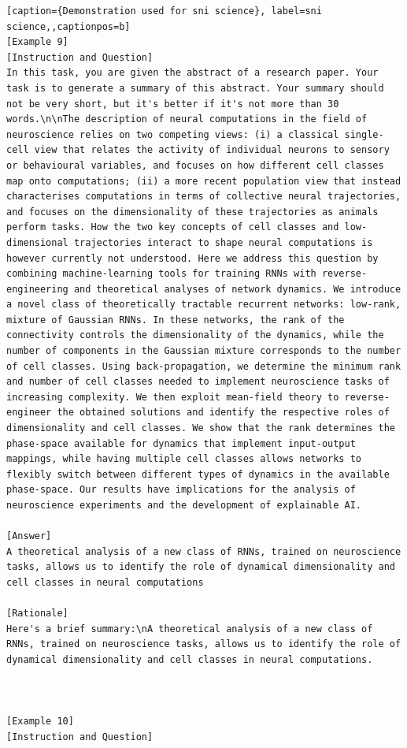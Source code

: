 \begin{lstlisting}[caption={Demonstration used for sni science}, label=sni science,,captionpos=b]
[Example 9]
[Instruction and Question]
In this task, you are given the abstract of a research paper. Your task is to generate a summary of this abstract. Your summary should not be very short, but it's better if it's not more than 30 words.\n\nThe description of neural computations in the field of neuroscience relies on two competing views: (i) a classical single-cell view that relates the activity of individual neurons to sensory or behavioural variables, and focuses on how different cell classes map onto computations; (ii) a more recent population view that instead characterises computations in terms of collective neural trajectories, and focuses on the dimensionality of these trajectories as animals perform tasks. How the two key concepts of cell classes and low-dimensional trajectories interact to shape neural computations is however currently not understood. Here we address this question by combining machine-learning tools for training RNNs with reverse-engineering and theoretical analyses of network dynamics. We introduce a novel class of theoretically tractable recurrent networks: low-rank, mixture of Gaussian RNNs. In these networks, the rank of the connectivity controls the dimensionality of the dynamics, while the number of components in the Gaussian mixture corresponds to the number of cell classes. Using back-propagation, we determine the minimum rank and number of cell classes needed to implement neuroscience tasks of increasing complexity. We then exploit mean-field theory to reverse-engineer the obtained solutions and identify the respective roles of dimensionality and cell classes. We show that the rank determines the phase-space available for dynamics that implement input-output mappings, while having multiple cell classes allows networks to flexibly switch between different types of dynamics in the available phase-space. Our results have implications for the analysis of neuroscience experiments and the development of explainable AI.

[Answer]
A theoretical analysis of a new class of RNNs, trained on neuroscience tasks, allows us to identify the role of dynamical dimensionality and cell classes in neural computations

[Rationale]
Here's a brief summary:\nA theoretical analysis of a new class of RNNs, trained on neuroscience tasks, allows us to identify the role of dynamical dimensionality and cell classes in neural computations.



[Example 10]
[Instruction and Question]

    \end{lstlisting}
    




